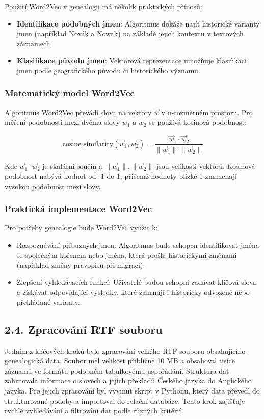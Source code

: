 \documentclass[12pt]{report}
\begin{document}
Použití Word2Vec v genealogii má několik praktických přínosů:
\begin{itemize}
    \item \textbf{Identifikace podobných jmen}: Algoritmus dokáže najít historické varianty jmen (například Novák a Nowak) na základě jejich kontextu v textových záznamech.
    \item \textbf{Klasifikace původu jmen}: Vektorová reprezentace umožňuje klasifikaci jmen podle geografického původu či historického významu.
\end{itemize}

\subsubsection{Matematický model Word2Vec}
Algoritmus Word2Vec převádí slova na vektory \( \vec{w} \) v n-rozměrném prostoru. Pro měření podobnosti mezi dvěma slovy \( w_1 \) a \( w_2 \) se používá kosinová podobnost:

\begin{equation}
\mathrm{cosine\_similarity}(\vec{w}_1, \vec{w}_2) = \frac{\vec{w}_1 \cdot \vec{w}_2}{\|\vec{w}_1\| \cdot \|\vec{w}_2\|}
\end{equation}


Kde \( \vec{w}_1 \cdot \vec{w}_2 \) je skalární součin a \( \|\vec{w}_1\|, \|\vec{w}_2\| \) jsou velikosti vektorů. Kosinová podobnost nabývá hodnot od -1 do 1, přičemž hodnoty blízké 1 znamenají vysokou podobnost mezi slovy.

\subsubsection{Praktická implementace Word2Vec}
Pro potřeby genealogie bude Word2Vec využit k:
\begin{itemize}
    \item Rozpoznávání příbuzných jmen: Algoritmus bude schopen identifikovat jména se společným kořenem nebo jména, která prošla historickými změnami (například změny pravopisu při migraci).
    \item Zlepšení vyhledávacích funkcí: Uživatelé budou schopni zadávat klíčová slova a získávat odpovídající výsledky, které zahrnují i historicky odvozené nebo překládané varianty.
\end{itemize}

\subsection{2.4. Zpracování RTF souboru}
Jedním z klíčových kroků bylo zpracování velkého RTF souboru obsahujícího genealogická data. Soubor měl velikost přibližně 10 MB a obsahoval tisíce záznamů ve formátu podobném tabulkovému uspořádání. Struktura dat zahrnovala informace o slovech a jejich překladů Českého jazyka do Anglického jazyka. Pro jejich zpracování byl vyvinut skript v Pythonu, který data převedl do strukturované podoby a importoval do relační databáze. Tento krok zajišťuje rychlé vyhledávání a filtrování dat podle různých kritérií.
\end{document}
